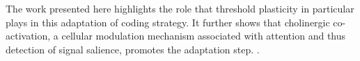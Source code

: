 The work presented here highlights the role that
        threshold plasticity in particular plays in this adaptation of coding strategy.
    It further shows that cholinergic co-activation,
        a cellular modulation mechanism associated with attention
        and thus detection of signal salience,
    promotes the adaptation step.
        .

